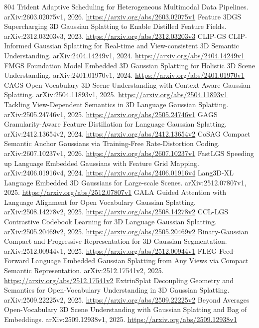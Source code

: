 \documentclass[11pt]{article}
\begin{document}
\begin{thebibliography}{804}
 Trident Adaptive Scheduling for Heterogeneous Multimodal Data Pipelines. arXiv:2603.02075v1, 2026. \url{https://arxiv.org/abs/2603.02075v1}
 Feature 3DGS Supercharging 3D Gaussian Splatting to Enable Distilled Feature Fields. arXiv:2312.03203v3, 2023. \url{https://arxiv.org/abs/2312.03203v3}
 CLIP-GS CLIP-Informed Gaussian Splatting for Real-time and View-consistent 3D Semantic Understanding. arXiv:2404.14249v1, 2024. \url{https://arxiv.org/abs/2404.14249v1}
 FMGS Foundation Model Embedded 3D Gaussian Splatting for Holistic 3D Scene Understanding. arXiv:2401.01970v1, 2024. \url{https://arxiv.org/abs/2401.01970v1}
 CAGS Open-Vocabulary 3D Scene Understanding with Context-Aware Gaussian Splatting. arXiv:2504.11893v1, 2025. \url{https://arxiv.org/abs/2504.11893v1}
 Tackling View-Dependent Semantics in 3D Language Gaussian Splatting. arXiv:2505.24746v1, 2025. \url{https://arxiv.org/abs/2505.24746v1}
 GAGS Granularity-Aware Feature Distillation for Language Gaussian Splatting. arXiv:2412.13654v2, 2024. \url{https://arxiv.org/abs/2412.13654v2}
 CoSAG Compact Semantic Anchor Gaussians via Training-Free Rate-Distortion Coding. arXiv:2607.10237v1, 2026. \url{https://arxiv.org/abs/2607.10237v1}
 FastLGS Speeding up Language Embedded Gaussians with Feature Grid Mapping. arXiv:2406.01916v4, 2024. \url{https://arxiv.org/abs/2406.01916v4}
 Lang3D-XL Language Embedded 3D Gaussians for Large-scale Scenes. arXiv:2512.07807v1, 2025. \url{https://arxiv.org/abs/2512.07807v1}
 GALA Guided Attention with Language Alignment for Open Vocabulary Gaussian Splatting. arXiv:2508.14278v2, 2025. \url{https://arxiv.org/abs/2508.14278v2}
 CCL-LGS Contrastive Codebook Learning for 3D Language Gaussian Splatting. arXiv:2505.20469v2, 2025. \url{https://arxiv.org/abs/2505.20469v2}
 Binary-Gaussian Compact and Progressive Representation for 3D Gaussian Segmentation. arXiv:2512.00944v1, 2025. \url{https://arxiv.org/abs/2512.00944v1}
 FLEG Feed-Forward Language Embedded Gaussian Splatting from Any Views via Compact Semantic Representation. arXiv:2512.17541v2, 2025. \url{https://arxiv.org/abs/2512.17541v2}
 ExtrinSplat Decoupling Geometry and Semantics for Open-Vocabulary Understanding in 3D Gaussian Splatting. arXiv:2509.22225v2, 2025. \url{https://arxiv.org/abs/2509.22225v2}
 Beyond Averages Open-Vocabulary 3D Scene Understanding with Gaussian Splatting and Bag of Embeddings. arXiv:2509.12938v1, 2025. \url{https://arxiv.org/abs/2509.12938v1}

\end{thebibliography}
\end{document}
